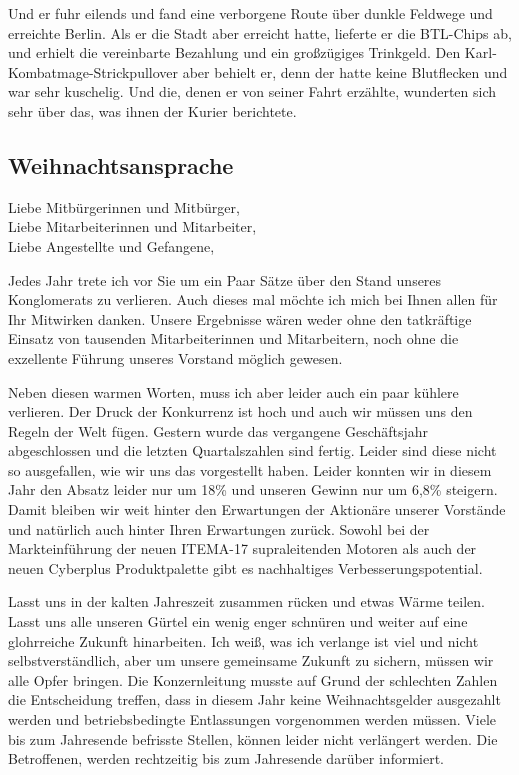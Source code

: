 Und er fuhr eilends und fand eine verborgene Route über dunkle Feldwege und erreichte Berlin.
Als er die Stadt aber erreicht hatte, lieferte er die BTL-Chips ab, und erhielt die vereinbarte Bezahlung und ein großzügiges Trinkgeld.
Den Karl-Kombatmage-Strickpullover aber behielt er, denn der hatte keine Blutflecken und war sehr kuschelig.
Und die, denen er von seiner Fahrt erzählte, wunderten sich sehr über das, was ihnen der Kurier berichtete.


\subsection{Weihnachtsansprache }
Liebe Mitbürgerinnen und Mitbürger,\\
Liebe Mitarbeiterinnen und Mitarbeiter,\\
Liebe Angestellte und Gefangene,

Jedes Jahr trete ich vor Sie um ein Paar Sätze über den Stand unseres
Konglomerats zu verlieren. Auch dieses mal möchte ich mich bei Ihnen
allen für Ihr Mitwirken danken. Unsere Ergebnisse wären weder ohne den
tatkräftige Einsatz von tausenden Mitarbeiterinnen und Mitarbeitern, noch
ohne die exzellente Führung unseres Vorstand möglich gewesen.

Neben diesen warmen Worten, muss ich aber leider auch ein paar kühlere
verlieren. Der Druck der Konkurrenz ist hoch und auch wir müssen uns den
Regeln der Welt fügen. Gestern wurde das vergangene Geschäftsjahr
abgeschlossen und die letzten Quartalszahlen sind fertig. Leider sind
diese nicht so ausgefallen, wie wir uns das vorgestellt haben. Leider
konnten wir in diesem Jahr den Absatz leider nur um 18\% und unseren
Gewinn nur um 6,8\% steigern. Damit bleiben wir weit hinter den
Erwartungen der Aktionäre unserer Vorstände und natürlich auch hinter
Ihren Erwartungen zurück.
Sowohl bei der Markteinführung der neuen ITEMA-17 supraleitenden Motoren
als auch der neuen Cyberplus Produktpalette gibt es nachhaltiges Verbesserungspotential.

Lasst uns in der kalten Jahreszeit zusammen rücken und etwas Wärme
teilen. Lasst uns alle unseren Gürtel ein wenig enger schnüren und weiter auf
eine glohrreiche Zukunft hinarbeiten. Ich weiß, was ich verlange ist
viel und nicht selbstverständlich, aber um unsere gemeinsame Zukunft zu
sichern, müssen wir alle Opfer bringen. Die Konzernleitung musste auf
Grund der schlechten Zahlen die Entscheidung treffen, dass in diesem
Jahr keine Weihnachtsgelder ausgezahlt werden und betriebsbedingte Entlassungen 
vorgenommen werden müssen. Viele bis zum Jahresende befrisste Stellen, können leider nicht verlängert werden. Die Betroffenen, werden rechtzeitig bis zum Jahresende darüber informiert.


